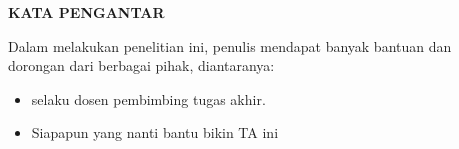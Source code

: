 \clearpage

\begin{center}
 \textbf{\large KATA PENGANTAR}\\[3em]
\end{center}

\blindtext{}

Dalam melakukan penelitian ini, penulis mendapat banyak bantuan dan dorongan dari berbagai pihak, diantaranya:
\begin{itemize}
  \item \supervisor{} selaku dosen pembimbing tugas akhir.
  \item Siapapun yang nanti bantu bikin TA ini
\end{itemize}


